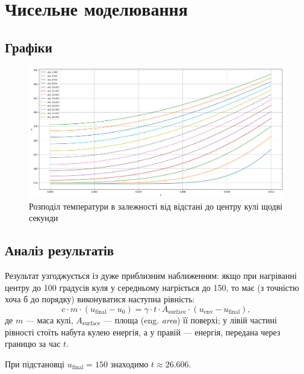 \section{Чисельне моделювання}

\subsection{Графіки}

\begin{figure}[H]
    \centering
    \includegraphics[width=\textwidth]{plots.png}
    \caption{Розподіл температури в залежності від відстані до центру кулі щодві секунди}
\end{figure}

\subsection{Аналіз результатів}

Результат узгоджується із дуже приблизним наближенням: якщо при нагріванні центру до 100 градусів куля у середньому нагріється до 150, то має (з точністю хоча б до порядку) виконуватися наступна рівність:
\begin{equation}
    c \cdot m \cdot (u_{\text{final}} - u_0) = \gamma \cdot t \cdot A_{\text{surface}} \cdot ( u_{\text{env}} - u_{\text{final}} ),
\end{equation}
де $m$ --- маса кулі, $A_{\text{surface}}$ --- площа (eng. \textit{area}) її поверхі; у лівій частині рівності стоїть набута кулею енергія, а у правій --- енергія, передана через границю за час $t$. \medskip

При підстановці $u_{\text{final}} = 150$ знаходимо $t \approx 26.606$. 


